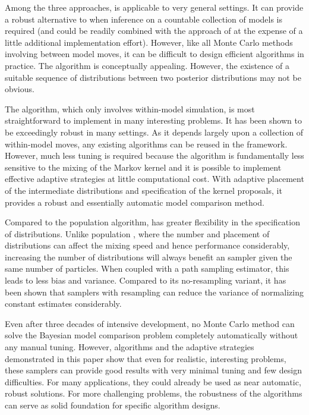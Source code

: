 Among the three approaches, \smc[1] is applicable to very general settings. It
can provide a robust alternative to \rjmcmc when inference on a countable
collection of models is required (and could be readily combined with the
approach of \cite{Jasra:2008bb} at the expense of a little additional
implementation effort). However, like all Monte Carlo methods involving
between model moves, it can be difficult to design efficient algorithms in
practice. The \smc[3] algorithm is conceptually appealing. However, the
existence of a suitable sequence of distributions between two posterior
distributions may not be obvious.

The \smc[2] algorithm, which only involves within-model simulation, is most
straightforward to implement in many interesting problems. It has been shown
to be exceedingly robust in many settings. As it depends largely upon a
collection of within-model \mcmc moves, any existing \mcmc algorithms can be
reused in the \smc[2] framework. However, much less tuning is required because
the algorithm is fundamentally less sensitive to the mixing of the Markov
kernel and it is possible to implement effective adaptive strategies at little
computational cost. With adaptive placement of the intermediate distributions
and specification of the \mcmc kernel proposals, it provides a robust and
essentially automatic model comparison method.

Compared to the population \mcmc algorithm, \smc[2] has greater flexibility in
the specification of distributions. Unlike population \mcmc, where the number
and placement of distributions can affect the mixing speed and hence
performance considerably, increasing the number of distributions will always
benefit an \smc sampler given the same number of particles. When coupled with a
path sampling estimator, this leads to less bias and variance. Compared to its
no-resampling variant, it has been shown that \smc samplers with resampling
can reduce the variance of normalizing constant estimates considerably.

Even after three decades of intensive development, no Monte Carlo method can
solve the Bayesian model comparison problem completely automatically without
any manual tuning. However, \smc algorithms and the adaptive strategies
demonstrated in this paper show that even for realistic, interesting problems,
these samplers can provide good results with very minimal tuning and few
design difficulties. For many applications, they could already be used as near
automatic, robust solutions. For more challenging problems, the robustness of
the algorithms can serve as solid foundation for specific algorithm designs.
